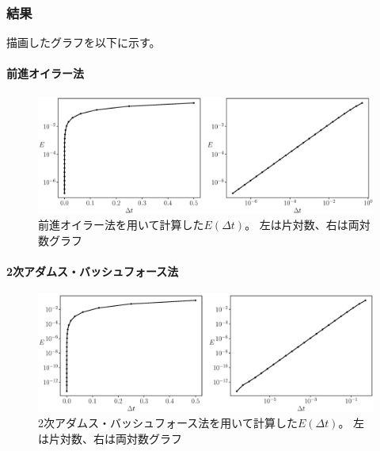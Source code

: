 \documentclass[a4j, titlepage]{jsarticle}
\numberwithin{equation}{section}
\begin{document}
        \subsubsection{結果}
            描画したグラフを以下に示す。
            \paragraph{前進オイラー法}
                \begin{center}
                    \begin{figure}[h]
                        \centering
                        \includegraphics[width=1\hsize]{kadai3/euler.eps}
                        \caption{
                            前進オイラー法を用いて計算した$E(\Delta t)$。
                            左は片対数、右は両対数グラフ
                        }
                    \end{figure}
                \end{center}

            \paragraph{2次アダムス・バッシュフォース法}
                \begin{center}
                    \begin{figure}[h]
                        \centering
                        \includegraphics[width=1\hsize]{kadai3/ab2.eps}
                        \caption{
                            2次アダムス・バッシュフォース法を用いて計算した$E(\Delta t)$。
                            左は片対数、右は両対数グラフ
                        }
                    \end{figure}
                \end{center}
\end{document}
